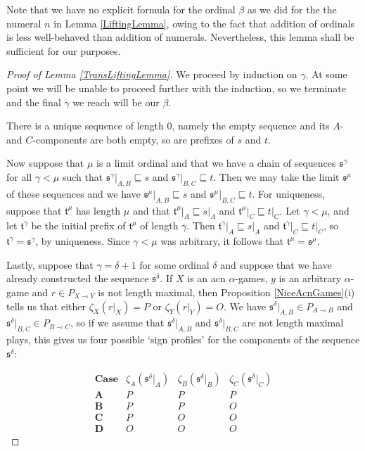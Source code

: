 \documentclass[11pt]{article} %
\theoremstyle{plain} %
\theoremstyle{definition} %
\theoremstyle{note}
\theoremstyle{exercisestyle}
\renewcommand{\implies}{\multimap}
\newcommand{\s}{\mathfrak s}
\renewcommand{\t}{\mathfrak t}
\newcommand{\prefix}{\sqsubseteq}
\begin{document}
Note that we have no explicit formula for the ordinal $\beta$ as we did for the the numeral $n$ in Lemma \ref{LiftingLemma}, owing to the fact that addition of ordinals is less well-behaved than addition of numerals.  Nevertheless, this lemma shall be sufficient for our purposes.  

\begin{proof}[Proof of Lemma \ref{TransLiftingLemma}]
  We proceed by induction on $\gamma$.  At some point we will be unable to proceed further with the induction, so we terminate and the final $\gamma$ we reach will be our $\beta$.  

  There is a unique sequence of length $0$, namely the empty sequence and its $A$- and $C$-components are both empty, so are prefixes of $s$ and $t$.  

  Now suppose that $\mu$ is a limit ordinal and that we have a chain of sequences $\s^\gamma$ for all $\gamma<\mu$ such that $\s^\gamma\vert_{A,B}\prefix s$ and $\s^\gamma\vert_{B,C}\prefix t$.  Then we may take the limit $\s^\mu$ of these sequences and we have $\s^\mu\vert_{A,B}\prefix s$ and $\s^\mu\vert_{B,C}\prefix t$.  For uniqueness, suppose that $\t^\mu$ has length $\mu$ and that $\t^\mu\vert_A\prefix s\vert_A$ and $\t^\mu\vert_C\prefix t\vert_C$.  Let $\gamma<\mu$, and let $\t^\gamma$ be the initial prefix of $\t^\mu$ of length $\gamma$.  Then $\t^\gamma\vert_A\prefix s\vert_A$ and $\t^\gamma\vert_C\prefix t\vert_C$, so $\t^\gamma=\s^\gamma$, by uniqueness.  Since $\gamma<\mu$ was arbitrary, it follows that $\t^\mu=\s^\mu$.  

  Lastly, suppose that $\gamma=\delta+1$ for some ordinal $\delta$ and suppose that we have already constructed the sequence $\s^\delta$.  If $X$ is an acn $\alpha$-games, $y$ is an arbitrary $\alpha$-game and $r\in P_{X\implies Y}$ is not length maximal, then Proposition \ref{NiceAcnGames}(i) tells us that either $\zeta_X(r\vert_X)=P$ or $\zeta_Y(r\vert_Y)=O$.  We have $\s^\delta\vert_{A,B}\in P_{A\implies B}$ and $\s^\delta\vert_{B,C}\in P_{B\implies C}$, so if we assume that $\s^\delta\vert_{A,B}$ and $\s^\delta\vert_{B,C}$ are not length maximal plays, this gives us four possible `sign profiles' for the components of the sequence $\s^\delta$:

  \[
    \begin{array}{c|ccc}
      \textbf{Case} & \zeta_A(\s^\delta\vert_A) & \zeta_B(\s^\delta\vert_B) & \zeta_C(\s^\delta\vert_C) \\
      \hline
      \textbf{A} & P & P & P \\
      \textbf{B} & P & P & O \\
      \textbf{C} & P & O & O \\
      \textbf{D} & O & O & O
    \end{array}
    \]


\end{proof}
\end{document}
